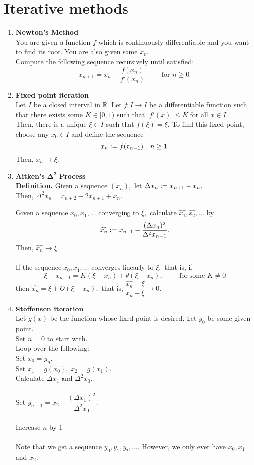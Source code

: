 \documentclass[12pt]{article}
\theoremstyle{definition}
\begin{document}
\section{Iterative methods}
\begin{enumerate} 
	\itemsep1em
	\item \textbf{Newton's Method} \\
	You are given a function $f$ which is continuously differentiable and you want to find its root. You are also given some $x_0.$\\
	Compute the following sequence recursively until satisfied:
	\[x_{n+1} = x_n - \frac{f(x_n)}{f'(x_n)} \qquad \text{ for } n \ge 0.\]
	\item \textbf{Fixed point iteration}\\
	Let $I$ be a closed interval in $\mathbb{R}.$ Let $f:I\to I$ be a differentiable function such that there exists some $K \in [0, 1)$ such that $|f'(x)| \le K$ for all $x \in I.$\\
	Then, there is a unique $\xi \in I$ such that $f(\xi) = \xi.$ To find this fixed point, choose any $x_0 \in I$ and define the sequence
	\[x_n \vcentcolon= f(x_{n-1}) \quad n \ge 1.\]
	Then, $x_n \to \xi.$
	\item \textbf{Aitken's} $\mathbf{\Delta^2}$ \textbf{Process}\\
	\textbf{Definition.} Given a sequence $(x_n),$ let $\Delta x_n \vcentcolon= x_{n+1} - x_n.$\\
	Then, $\Delta^2x_n = x_{n+2} - 2x_{n+1} + x_n.$
	
	Given a sequence $x_0, x_1, \ldots$ converging to $\xi,$ calculate $\widehat{x_1}, \widehat{x_2}, \ldots$ by
	\[\widehat{x_n} \vcentcolon= x_{n+1} - \frac{(\Delta x_n)^2}{\Delta^2x_{n-1}}.\]
	Then, $\widehat{x_n} \to \xi.$\\~\\
	If the sequence $x_0, x_1, \ldots$ converges linearly to $\xi,$ that is, if
	\[\xi - x_{n+1} = K(\xi - x_n) + \theta(\xi - x_n), \qquad \text{ for some } K \neq 0\]
	then $\widehat{x_n} = \xi + O(\xi - x_n),$ that is, $\dfrac{\widehat{x_n} - \xi}{x_n - \xi} \to 0.$
	\item \textbf{Steffensen iteration}\\
	Let $g(x)$ be the function whose fixed point is desired. Let $y_0$ be some given point.\\
	Set $n = 0$ to start with.\\
	Loop over the following:\\
	Set $x_0 = y_n.$\\
	Set $x_1 = g(x_0),\;x_2 = g(x_1).$\\
	Calculate $\Delta x_1$ and $\Delta^2x_0.$\\~\\
	Set $y_{n+1} = x_2 - \dfrac{(\Delta x_1)^2}{\Delta^2x_0}.$\\~\\
	Increase $n$ by 1.\\~\\
	Note that we get a sequence $y_0, y_1, y_2, \ldots.$ However, we only ever have $x_0, x_1$ and $x_2.$
\end{enumerate}
\end{document}
